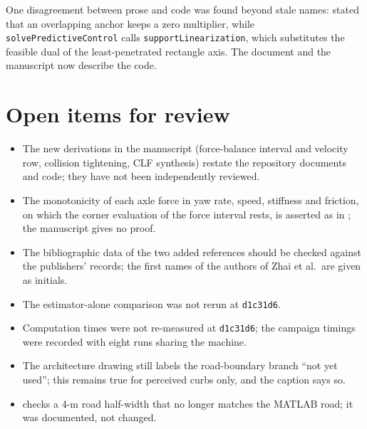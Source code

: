 \documentclass[11pt]{article}
\begin{document}
One disagreement between prose and code was found beyond stale names:
 stated that an overlapping anchor keeps a zero
multiplier, while \texttt{solvePredictiveControl} calls
\texttt{supportLinearization}, which substitutes the feasible dual of the
least-penetrated rectangle axis. The document and the manuscript now describe
the code.

\section{Open items for review}
\begin{itemize}
\item The new derivations in the manuscript (force-balance interval and
  velocity row, collision tightening, CLF synthesis) restate the repository
  documents and code; they have not been independently reviewed.
\item The monotonicity of each axle force in yaw rate, speed, stiffness and
  friction, on which the corner evaluation of the force interval rests, is
  asserted as in ; the manuscript
  gives no proof.
\item The bibliographic data of the two added references should be checked
  against the publishers' records; the first names of the authors of Zhai et
  al.\ are given as initials.
\item The estimator-alone comparison was not rerun at \texttt{d1c31d6}.
\item Computation times were not re-measured at \texttt{d1c31d6}; the
  campaign timings were recorded with eight runs sharing the machine.
\item The architecture drawing still labels the road-boundary branch ``not
  yet used''; this remains true for perceived curbs only, and the caption says
  so.
\item {} checks a 4-m road
  half-width that no longer matches the MATLAB road; it was documented, not
  changed.
\end{itemize}
\end{document}
